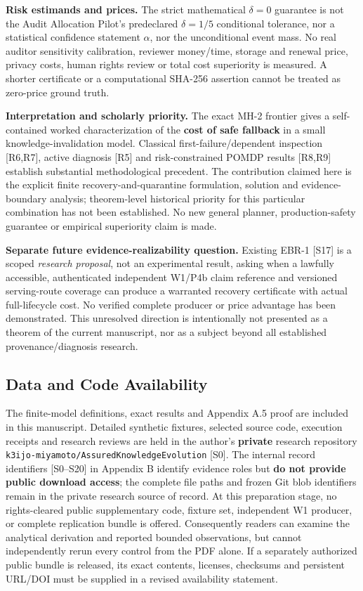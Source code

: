 \documentclass[
  10pt,
  american,
  a4paper,
]{article}
\begin{document}
\textbf{Risk estimands and prices.} The strict mathematical \(\delta=0\)
guarantee is not the Audit Allocation Pilot's predeclared \(\delta=1/5\)
conditional tolerance, nor a statistical confidence statement
\(\alpha\), nor the unconditional event mass. No real auditor
sensitivity calibration, reviewer money/time, storage and renewal price,
privacy costs, human rights review or total cost superiority is
measured. A shorter certificate or a computational SHA-256 assertion
cannot be treated as zero-price ground truth.

\textbf{Interpretation and scholarly priority.} The exact MH-2 frontier
gives a self-contained worked characterization of the \textbf{cost of
safe fallback} in a small knowledge-invalidation model. Classical
first-failure/dependent inspection {[}R6,R7{]}, active diagnosis
{[}R5{]} and risk-constrained POMDP results {[}R8,R9{]} establish
substantial methodological precedent. The contribution claimed here is
the explicit finite recovery-and-quarantine formulation, solution and
evidence-boundary analysis; theorem-level historical priority for this
particular combination has not been established. No new general planner,
production-safety guarantee or empirical superiority claim is made.

\textbf{Separate future evidence-realizability question.} Existing EBR-1
{[}S17{]} is a scoped \emph{research proposal}, not an experimental
result, asking when a lawfully accessible, authenticated independent
W1/P4b claim reference and versioned serving-route coverage can produce
a warranted recovery certificate with actual full-lifecycle cost. No
verified complete producer or price advantage has been demonstrated.
This unresolved direction is intentionally not presented as a theorem of
the current manuscript, nor as a subject beyond all established
provenance/diagnosis research.

\hypertarget{data-and-code-availability}{%
\subsection{Data and Code
Availability}\label{data-and-code-availability}}

The finite-model definitions, exact results and Appendix A.5 proof are
included in this manuscript. Detailed synthetic fixtures, selected
source code, execution receipts and research reviews are held in the
author's \textbf{private} research repository
\texttt{k3ijo-miyamoto/AssuredKnowledgeEvolution} {[}S0{]}. The internal
record identifiers {[}S0--S20{]} in Appendix B identify evidence roles
but \textbf{do not provide public download access}; the complete file
paths and frozen Git blob identifiers remain in the private research
source of record. At this preparation stage, no rights-cleared public
supplementary code, fixture set, independent W1 producer, or complete
replication bundle is offered. Consequently readers can examine the
analytical derivation and reported bounded observations, but cannot
independently rerun every control from the PDF alone. If a separately
authorized public bundle is released, its exact contents, licenses,
checksums and persistent URL/DOI must be supplied in a revised
availability statement.
\end{document}
